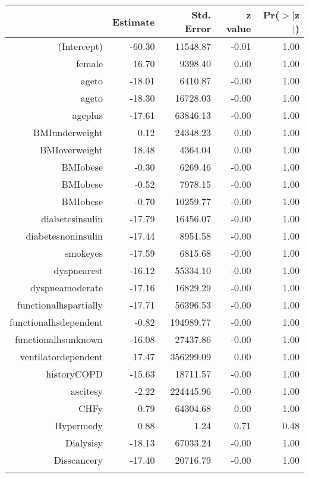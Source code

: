 \bigskip\bigskip
\centering
\begin{tabular}{rrrrr}
  \hline
 & Estimate & Std. Error & z value & Pr($>$$|$z$|$) \\ 
  \hline
(Intercept) & -60.30 & 11548.87 & -0.01 & 1.00 \\ 
  female & 16.70 & 9398.40 & 0.00 & 1.00 \\ 
  age\-65\-to\-74 & -18.01 & 6410.87 & -0.00 & 1.00 \\ 
  age\-75\-to\-84 & -18.30 & 16728.03 & -0.00 & 1.00 \\ 
  age\-85\-plus & -17.61 & 63846.13 & -0.00 & 1.00 \\ 
  BMI\-underweight & 0.12 & 24348.23 & 0.00 & 1.00 \\ 
  BMI\-overweight & 18.48 & 4364.04 & 0.00 & 1.00 \\ 
  BMI\-obese\-1 & -0.30 & 6269.46 & -0.00 & 1.00 \\ 
  BMI\-obese\-2 & -0.52 & 7978.15 & -0.00 & 1.00 \\ 
  BMI\-obese\-3 & -0.70 & 10259.77 & -0.00 & 1.00 \\ 
  diabetes\-insulin & -17.79 & 16456.07 & -0.00 & 1.00 \\ 
  diabetes\-noninsulin & -17.44 & 8951.58 & -0.00 & 1.00 \\ 
  smoke\-yes & -17.59 & 6815.68 & -0.00 & 1.00 \\ 
  dyspnea\-rest & -16.12 & 55334.10 & -0.00 & 1.00 \\ 
  dyspnea\-moderate & -17.16 & 16829.29 & -0.00 & 1.00 \\ 
  functional\-hs\-partially & -17.71 & 56396.53 & -0.00 & 1.00 \\ 
  functional\-hs\-dependent & -0.82 & 194989.77 & -0.00 & 1.00 \\ 
  functional\-hs\-unknown & -16.08 & 27437.86 & -0.00 & 1.00 \\ 
  ventilator\-dependent & 17.47 & 356299.09 & 0.00 & 1.00 \\ 
  history\-COPD & -15.63 & 18711.57 & -0.00 & 1.00 \\ 
  ascites\-y & -2.22 & 224445.96 & -0.00 & 1.00 \\ 
  CHF\-y & 0.79 & 64304.68 & 0.00 & 1.00 \\ 
  Hyper\-med\-y & 0.88 & 1.24 & 0.71 & 0.48 \\ 
  Dialysis\-y & -18.13 & 67033.24 & -0.00 & 1.00 \\ 
  Diss\-cancer\-y & -17.40 & 20716.79 & -0.00 & 1.00 \\ 
$$
\end{tabular}
